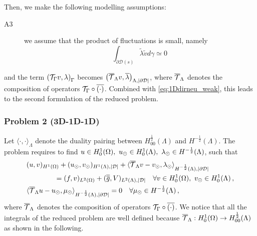 \documentclass[r]{siamart171218}
\begin{document}
Then, we make the following modelling assumptions:
\begin{description}
\item[A3] we assume that the product of fluctuations is small, namely
\begin{equation*}
\int_{\partial\mathcal{D}(s)} \tilde{\lambda}\tilde{v} d\gamma \simeq 0\,
\end{equation*}
\end{description}
and the term $\left({\mathcal{T}_\Gamma} v, \lambda \right)_{\Gamma}$ becomes $\left( {\overline{\mathcal{T}}_\Lambda} v, \overline{\lambda} \right)_{\Lambda, |\partial\mathcal{D}|}$, where ${\overline{\mathcal{T}}_\Lambda}$ denotes the composition of operators ${\mathcal{T}_\Gamma} \circ \overline{(\cdot)}$.  Combined with \eqref{eq:1Ddirneu_weak}, this leads to the second formulation of the reduced problem.

\subsubsection*{Problem 2 (3D-1D-1D)}
Let $\langle \cdot , \cdot \rangle_\Lambda$ denote the duality pairing between 
$H^\frac12_{00}(\Lambda)$ and $H^{-\frac12}(\Lambda)$.
The problem requires to find $u \in H^1_0(\Omega),\ u_{\odot} \in H^1_0(\Lambda), \ \lambda_{\odot} \in H^{-\frac12}(\Lambda)$, such that
\begin{subequations}\label{eq:problem2}
\begin{align}
&(u,v)_{H^1(\Omega)} + (u_{\odot},v_{\odot})_{H^1(\Lambda),|\mathcal{D}|} 
+  \langle {\overline{\mathcal{T}}_\Lambda} v - v_{\odot}, \lambda_{\odot} \rangle_{H^{-\frac12}(\Lambda), |\partial\mathcal{D}|} 
\\
\nonumber
&\qquad\qquad= (f,v)_{L^2(\Omega)} +  (\overline{\overline{g}},V)_{L^2(\Lambda),|\mathcal{D}|}
\quad \forall v \in H^1_0(\Omega), \ v_{\odot} \in H^1_0(\Lambda)\,,
\\
&   \langle {\overline{\mathcal{T}}_\Lambda} u -   u_{\odot}, \mu_{\odot} \rangle_{H^{-\frac12}(\Lambda),|\partial\mathcal{D}|} = 0
\quad \forall \mu_{\odot} \in H^{-\frac12}(\Lambda)\,,
\end{align}
\end{subequations}
where ${\overline{\mathcal{T}}_\Lambda}$ denotes the composition of operators ${\mathcal{T}_\Gamma} \circ \overline{(\cdot)}$.
We notice that all the integrals of the reduced problem are well defined because 
${\overline{\mathcal{T}}_\Lambda}: H^1_0(\Omega) \rightarrow H^\frac12_{00}(\Lambda)$ as shown in the following.\\
\end{document}
